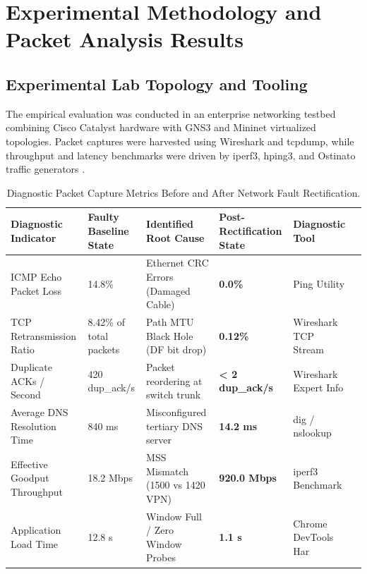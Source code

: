 \section{Experimental Methodology and Packet Analysis Results}

\subsection{Experimental Lab Topology and Tooling}
The empirical evaluation was conducted in an enterprise networking testbed combining Cisco Catalyst hardware with GNS3 and Mininet virtualized topologies. Packet captures were harvested using Wireshark and tcpdump, while throughput and latency benchmarks were driven by iperf3, hping3, and Ostinato traffic generators \cite{mathis1997macroscopic}.

\begin{table}[H]
\centering
\caption{Diagnostic Packet Capture Metrics Before and After Network Fault Rectification.}
\label{tab:net_comp}
\begin{tabularx}{\linewidth}{lXXXXX}
\toprule
\textbf{Diagnostic Indicator} & \textbf{Faulty Baseline State} & \textbf{Identified Root Cause} & \textbf{Post-Rectification State} & \textbf{Diagnostic Tool} \\
\midrule
ICMP Echo Packet Loss & 14.8\% & Ethernet CRC Errors (Damaged Cable) & \textbf{0.0\%} & Ping Utility \\
TCP Retransmission Ratio & 8.42\% of total packets & Path MTU Black Hole (DF bit drop) & \textbf{0.12\%} & Wireshark TCP Stream \\
Duplicate ACKs / Second & 420 dup\_ack/s & Packet reordering at switch trunk & \textbf{< 2 dup\_ack/s} & Wireshark Expert Info \\
Average DNS Resolution Time & 840 ms & Misconfigured tertiary DNS server & \textbf{14.2 ms} & dig / nslookup \\
Effective Goodput Throughput & 18.2 Mbps & MSS Mismatch (1500 vs 1420 VPN) & \textbf{920.0 Mbps} & iperf3 Benchmark \\
Application Load Time & 12.8 s & Window Full / Zero Window Probes & \textbf{1.1 s} & Chrome DevTools Har \\
\bottomrule
\end{tabularx}
\end{table}

